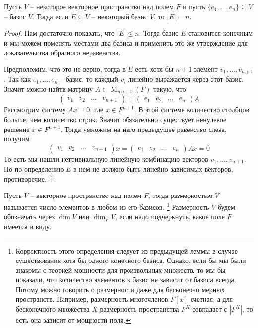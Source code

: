 \begin{claim}
Пусть $V$ -- некоторое векторное пространство над полем $F$ и пусть $\{e_1,\ldots,e_n\}\subseteq V$ -- базис $V$.
Тогда если $E\subseteq V$ -- некоторый базис $V$, то $|E| = n$.
\end{claim}
\begin{proof}
Нам достаточно показать, что $|E|\leqslant n$.
Тогда базис $E$ становится конечным и мы можем поменять местами два базиса и применить это же утверждение для доказательства обратного неравенства.

Предположим, что это не верно, тогда в $E$ есть хотя бы $n+1$ элемент $v_1,\ldots, v_{n+1}$.
Так как $e_1,\ldots, e_n$ -- базис, то каждый $v_i$ линейно выражается через этот базис.
Значит можно найти матрицу $A\in \operatorname{M}_{n\,n+1}(F)$ такую, что
\[
\begin{pmatrix}
{v_1}&{v_2}&{\ldots}&{v_{n+1}}
\end{pmatrix}
=
\begin{pmatrix}
{e_1}&{e_2}&{\ldots}&{e_n}
\end{pmatrix}
A
\]
Рассмотрим систему $Ax = 0$, где $x\in F^{n+1}$.
В этой системе количество столбцов больше, чем количество строк.
Значит обязательно существует ненулевое решение $x\in F^{n+1}$.
Тогда умножим на него предыдущее равенство слева, получим
\[
\begin{pmatrix}
{v_1}&{v_2}&{\ldots}&{v_{n+1}}
\end{pmatrix}x
=
\begin{pmatrix}
{e_1}&{e_2}&{\ldots}&{e_n}
\end{pmatrix}
Ax=
0
\]
То есть мы нашли нетривиальную линейную комбинацию векторов $v_1,\ldots, v_{n+1}$.
Но по определению $E$ в нем не должно быть линейно зависимых векторов, противоречие.
\end{proof}

Пусть $V$ -- векторное пространство над полем $F$, тогда размерностью $V$ называется число элементов в любом из его базисов.%
\footnote{Корректность этого определения следует из предыдущей леммы в случае существования хотя бы одного конечного базиса.
Однако, если бы мы были знакомы с теорией мощности для произвольных множеств, то мы бы показали, что количество элементов в базис не зависит от базиса всегда.
Потому можно говорить о размерности даже для бесконечно мерных пространств.
Например, размерность многочленов $F[x]$ счетная, а для бесконечного множества $X$ размерность пространства $F^X$ совпадает с $|F^X|$, то есть она зависит от мощности поля.}
Размерность $V$ будем обозначать через $\dim V$ или $\dim_F V$, если надо подчеркнуть, какое поле $F$ имеется в виду.

